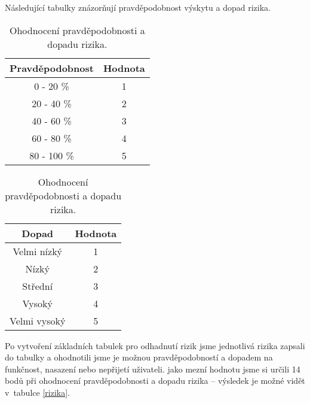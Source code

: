 \par Následující tabulky znázorňují pravděpodobnost výskytu a dopad rizika.
\begin{table}[!htb]
    \begin{minipage}{.5\linewidth}
      \centering
\begin{tabular}{|c | c |}
\hline
Pravděpodobnost&Hodnota\\
\hline
0 - 20 \%&1\\
\hline
20 - 40 \%&2\\
\hline
40 - 60 \%&3\\
\hline
60 - 80 \%&4\\
\hline
80 - 100 \%&5\\
\hline
\end{tabular}
    \end{minipage}%
    \begin{minipage}{.5\linewidth}
      \centering

\begin{tabular}{|c | c |}
\hline
Dopad&Hodnota\\
\hline
Velmi nízký&1\\
\hline
Nízký&2\\
\hline
Střední&3\\
\hline
Vysoký&4\\
\hline
Velmi vysoký&5\\
\hline
\end{tabular}
    \end{minipage} 
    \caption{Ohodnocení pravděpodobnosti a dopadu rizika.}
\end{table}

\par Po vytvoření základních tabulek pro odhadnutí rizik jsme jednotlivá rizika zapsali do tabulky a ohodnotili jsme je možnou pravděpodobností a dopadem na funkčnost, nasazení nebo nepřijetí uživateli. jako mezní hodnotu jsme si určili 14 bodů při ohodnocení pravděpodobnosti a dopadu rizika -- výsledek je možné vidět v~tabulce \ref{rizika}.

